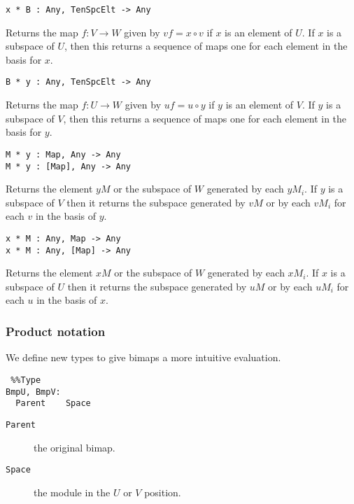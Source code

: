 \documentclass{amsart}
\begin{document}
\color{blue}
\index{$*$}
{\small \begin{verbatim}
x * B : Any, TenSpcElt -> Any
\end{verbatim} }
\color{black}

Returns the map $f : V\rightarrow W$ given by $vf = x\circ v$ if $x$ is an 
element of $U$. If $x$ is a subspace of $U$, then this returns a sequence of 
maps one for each element in the basis for $x$.

\color{blue}
\index{$*$}
{\small \begin{verbatim}
B * y : Any, TenSpcElt -> Any
\end{verbatim} }
\color{black}

Returns the map $f : U\rightarrow W$ given by $uf = u\circ y$ if $y$ is an 
element of $V$. If $y$ is a subspace of $V$, then this returns a sequence of 
maps one for each element in the basis for $y$.

\color{blue}
\index{$*$}
{\small \begin{verbatim}
M * y : Map, Any -> Any
M * y : [Map], Any -> Any
\end{verbatim} }
\color{black}

Returns the element $yM$ or the subspace of $W$ generated by each $yM_i$. If $y$
is a subspace of $V$ then it returns the subspace generated by $vM$ or by each
$vM_i$ for each $v$ in the basis of $y$.

\color{blue}
\index{$*$}
{\small \begin{verbatim}
x * M : Any, Map -> Any
x * M : Any, [Map] -> Any
\end{verbatim} }
\color{black}

Returns the element $xM$ or the subspace of $W$ generated by each $xM_i$. If $x$
is a subspace of $U$ then it returns the subspace generated by $uM$ or by each
$uM_i$ for each $u$ in the basis of $x$.

\subsubsection{Product notation} %
We define new types to give bimaps a more intuitive evaluation.

\color{blue}
{\small \begin{verbatim} %%Type
BmpU, BmpV:
  Parent    Space
\end{verbatim} }
\color{black}

\begin{description}
\item[{\tt Parent}] the original bimap.
\item[{\tt Space}] the module in the $U$ or $V$ position.
\end{description}
\end{document}
